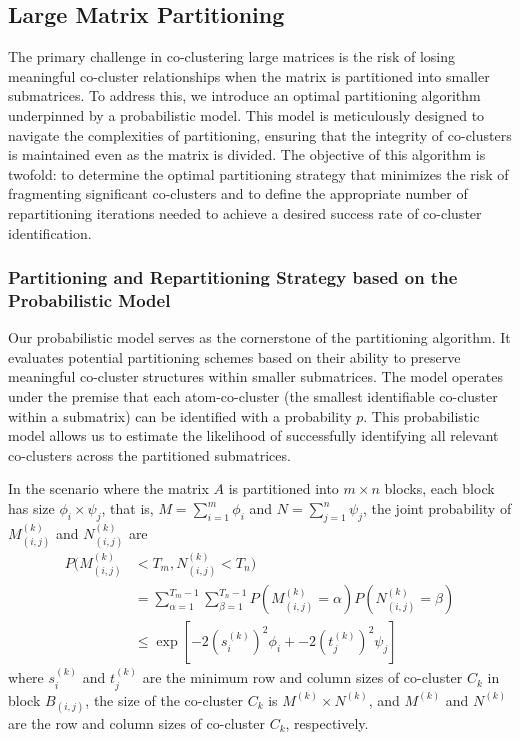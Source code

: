 \documentclass[journal]{IEEEtran}
\begin{document}
\subsection{Large Matrix Partitioning}
The primary challenge in co-clustering large matrices is the risk of losing meaningful co-cluster relationships when the matrix is partitioned into smaller submatrices. To address this, we introduce an optimal partitioning algorithm underpinned by a probabilistic model. This model is meticulously designed to navigate the complexities of partitioning, ensuring that the integrity of co-clusters is maintained even as the matrix is divided. The objective of this algorithm is twofold: to determine the optimal partitioning strategy that minimizes the risk of fragmenting significant co-clusters and to define the appropriate number of repartitioning iterations needed to achieve a desired success rate of co-cluster identification.

\subsubsection{Partitioning and Repartitioning Strategy based on the Probabilistic Model}
Our probabilistic model serves as the cornerstone of the partitioning algorithm. It evaluates potential partitioning schemes based on their ability to preserve meaningful co-cluster structures within smaller submatrices. The model operates under the premise that each atom-co-cluster (the smallest identifiable co-cluster within a submatrix) can be identified with a probability $p$. This probabilistic model allows us to estimate the likelihood of successfully identifying all relevant co-clusters across the partitioned submatrices.

In the scenario where the matrix $A$ is partitioned into $m \times n$ blocks, each block has size $\phi_i \times \psi_j$, that is, $M=\sum_{i=1}^m \phi_i$ and $N=\sum_{j=1}^n \psi_j$, the joint probability of $M_{(i,j)}^{(k)}$ and $N_{(i,j)}^{(k)}$ are
\begin{align*}
  P(M_{(i,j)}^{(k)} & < T_m, N_{(i,j)}^{(k)} < T_n)                               \\ & = \sum_{\alpha=1}^{T_m-1} \sum_{\beta=1}^{T_n-1} P(M_{(i,j)}^{(k)} = \alpha) P(N_{(i,j)}^{(k)} = \beta) \\
                    & \le \exp[-2 (s_i^{(k)})^2 \phi_i + -2 (t_j^{(k)})^2 \psi_j]
\end{align*}
where $s_i^{(k)}$ and $t_j^{(k)}$ are the minimum row and column sizes of co-cluster $C_k$ in block $B_{(i,j)}$, the size of the co-cluster $C_k$ is $M^{(k)} \times N^{(k)}$, and $M^{(k)}$ and $N^{(k)}$ are the row and column sizes of co-cluster $C_k$, respectively.
\end{document}
